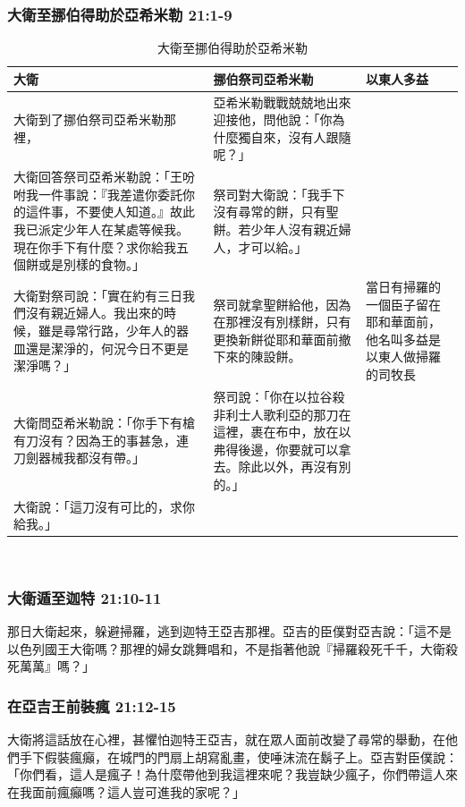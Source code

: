 \subsubsection{大衛至挪伯得助於亞希米勒 21:1-9}
\begin{table}[H]
\centering 
\begin{tabular}{p{7.3cm}|p{6.5cm}|p{3.25cm}}\hline\hline
大衛&挪伯祭司亞希米勒&以東人多益\\\hline
大衛到了挪伯祭司亞希米勒那裡，&亞希米勒戰戰兢兢地出來迎接他，問他說：「你為什麼獨自來，沒有人跟隨呢？」&\\\hline
大衛回答祭司亞希米勒說：「王吩咐我一件事說：『我差遣你委託你的這件事，不要使人知道。』故此我已派定少年人在某處等候我。現在你手下有什麼？求你給我五個餅或是別樣的食物。」&祭司對大衛說：「我手下沒有尋常的餅，只有聖餅。若少年人沒有親近婦人，才可以給。」& \\\hline
大衛對祭司說：「實在約有三日我們沒有親近婦人。我出來的時候，雖是尋常行路，少年人的器皿還是潔淨的，何況今日不更是潔淨嗎？」&祭司就拿聖餅給他，因為在那裡沒有別樣餅，只有更換新餅從耶和華面前撤下來的陳設餅。&當日有掃羅的一個臣子留在耶和華面前，他名叫多益是以東人做掃羅的司牧長\\\hline
大衛問亞希米勒說：「你手下有槍有刀沒有？因為王的事甚急，連刀劍器械我都沒有帶。」&祭司說：「你在以拉谷殺非利士人歌利亞的那刀在這裡，裹在布中，放在以弗得後邊，你要就可以拿去。除此以外，再沒有別的。」& \\\hline
大衛說：「這刀沒有可比的，求你給我。」&&\\\hline
\end{tabular}
\caption{大衛至挪伯得助於亞希米勒}
\end{table}
 

\subsubsection{大衛遁至迦特 21:10-11}
那日大衛起來，躲避掃羅，逃到迦特王亞吉那裡。亞吉的臣僕對亞吉說：「這不是以色列國王大衛嗎？那裡的婦女跳舞唱和，不是指著他說『掃羅殺死千千，大衛殺死萬萬』嗎？」

\subsubsection{在亞吉王前裝瘋 21:12-15}
大衛將這話放在心裡，甚懼怕迦特王亞吉，就在眾人面前改變了尋常的舉動，在他們手下假裝瘋癲，在城門的門扇上胡寫亂畫，使唾沫流在鬍子上。亞吉對臣僕說：「你們看，這人是瘋子！為什麼帶他到我這裡來呢？我豈缺少瘋子，你們帶這人來在我面前瘋癲嗎？這人豈可進我的家呢？」

